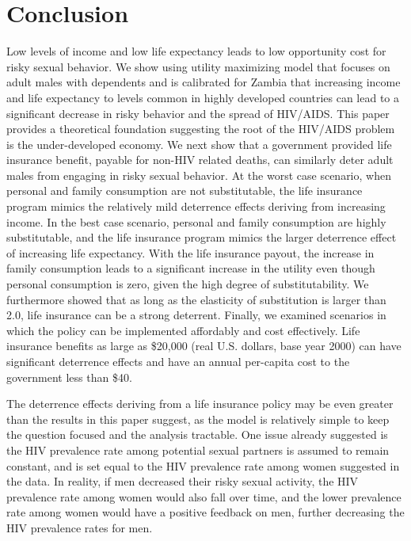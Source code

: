 \documentclass[12pt]{article}
\begin{document}
\section{Conclusion}
Low levels of income and low life expectancy leads to low opportunity cost for risky sexual behavior.  We show using utility maximizing model that focuses on adult males with dependents and is calibrated for Zambia that increasing income and life expectancy to levels common in highly developed countries can lead to a significant decrease in risky behavior and the spread of HIV/AIDS.  This paper provides a theoretical foundation suggesting the root of the HIV/AIDS problem is the under-developed economy.  We next show that a government provided life insurance benefit, payable for non-HIV related deaths, can similarly deter adult males from engaging in risky sexual behavior.  At the worst case scenario, when personal and family consumption are not substitutable, the life insurance program mimics the relatively mild deterrence effects deriving from increasing income.  In the best case scenario, personal and family consumption are highly substitutable, and the life insurance program mimics the larger deterrence effect of increasing life expectancy.  With the life insurance payout, the increase in family consumption leads to a significant increase in the utility even though personal consumption is zero, given the high degree of substitutability.  We furthermore showed that as long as the elasticity of substitution is larger than 2.0, life insurance can be a strong deterrent.  Finally, we examined scenarios in which the policy can be implemented affordably and cost effectively.  Life insurance benefits as large as \$20,000 (real U.S. dollars, base year 2000) can have significant deterrence effects and have an annual per-capita cost to the government less than \$40.

The deterrence effects deriving from a life insurance policy may be even greater than the results in this paper suggest, as the model is relatively simple to keep the question focused and the analysis tractable.  One issue already suggested is the HIV prevalence rate among potential sexual partners is assumed to remain constant, and is set equal to the HIV prevalence rate among women suggested in the data.  In reality, if men decreased their risky sexual activity, the HIV prevalence rate among women would also fall over time, and the lower prevalence rate among women would have a positive feedback on men, further decreasing the HIV prevalence rates for men.
\end{document}
